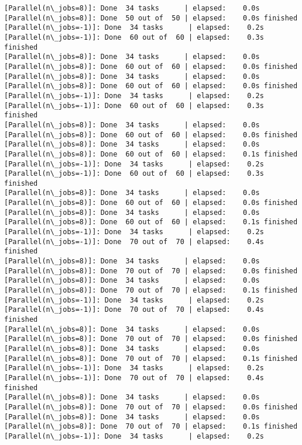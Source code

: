 \documentclass[11pt]{article}
\begin{document}
\begin{Verbatim}[commandchars=\\\{\}]
[Parallel(n\_jobs=8)]: Done  34 tasks      | elapsed:    0.0s
[Parallel(n\_jobs=8)]: Done  50 out of  50 | elapsed:    0.0s finished
[Parallel(n\_jobs=-1)]: Done  34 tasks      | elapsed:    0.2s
[Parallel(n\_jobs=-1)]: Done  60 out of  60 | elapsed:    0.3s finished
[Parallel(n\_jobs=8)]: Done  34 tasks      | elapsed:    0.0s
[Parallel(n\_jobs=8)]: Done  60 out of  60 | elapsed:    0.0s finished
[Parallel(n\_jobs=8)]: Done  34 tasks      | elapsed:    0.0s
[Parallel(n\_jobs=8)]: Done  60 out of  60 | elapsed:    0.0s finished
[Parallel(n\_jobs=-1)]: Done  34 tasks      | elapsed:    0.2s
[Parallel(n\_jobs=-1)]: Done  60 out of  60 | elapsed:    0.3s finished
[Parallel(n\_jobs=8)]: Done  34 tasks      | elapsed:    0.0s
[Parallel(n\_jobs=8)]: Done  60 out of  60 | elapsed:    0.0s finished
[Parallel(n\_jobs=8)]: Done  34 tasks      | elapsed:    0.0s
[Parallel(n\_jobs=8)]: Done  60 out of  60 | elapsed:    0.1s finished
[Parallel(n\_jobs=-1)]: Done  34 tasks      | elapsed:    0.2s
[Parallel(n\_jobs=-1)]: Done  60 out of  60 | elapsed:    0.3s finished
[Parallel(n\_jobs=8)]: Done  34 tasks      | elapsed:    0.0s
[Parallel(n\_jobs=8)]: Done  60 out of  60 | elapsed:    0.0s finished
[Parallel(n\_jobs=8)]: Done  34 tasks      | elapsed:    0.0s
[Parallel(n\_jobs=8)]: Done  60 out of  60 | elapsed:    0.1s finished
[Parallel(n\_jobs=-1)]: Done  34 tasks      | elapsed:    0.2s
[Parallel(n\_jobs=-1)]: Done  70 out of  70 | elapsed:    0.4s finished
[Parallel(n\_jobs=8)]: Done  34 tasks      | elapsed:    0.0s
[Parallel(n\_jobs=8)]: Done  70 out of  70 | elapsed:    0.0s finished
[Parallel(n\_jobs=8)]: Done  34 tasks      | elapsed:    0.0s
[Parallel(n\_jobs=8)]: Done  70 out of  70 | elapsed:    0.1s finished
[Parallel(n\_jobs=-1)]: Done  34 tasks      | elapsed:    0.2s
[Parallel(n\_jobs=-1)]: Done  70 out of  70 | elapsed:    0.4s finished
[Parallel(n\_jobs=8)]: Done  34 tasks      | elapsed:    0.0s
[Parallel(n\_jobs=8)]: Done  70 out of  70 | elapsed:    0.0s finished
[Parallel(n\_jobs=8)]: Done  34 tasks      | elapsed:    0.0s
[Parallel(n\_jobs=8)]: Done  70 out of  70 | elapsed:    0.1s finished
[Parallel(n\_jobs=-1)]: Done  34 tasks      | elapsed:    0.2s
[Parallel(n\_jobs=-1)]: Done  70 out of  70 | elapsed:    0.4s finished
[Parallel(n\_jobs=8)]: Done  34 tasks      | elapsed:    0.0s
[Parallel(n\_jobs=8)]: Done  70 out of  70 | elapsed:    0.0s finished
[Parallel(n\_jobs=8)]: Done  34 tasks      | elapsed:    0.0s
[Parallel(n\_jobs=8)]: Done  70 out of  70 | elapsed:    0.1s finished
[Parallel(n\_jobs=-1)]: Done  34 tasks      | elapsed:    0.2s

\end{Verbatim}
\end{document}
